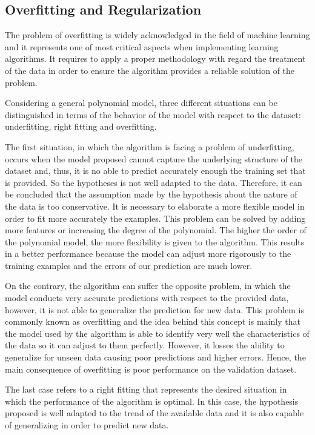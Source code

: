 \documentclass[a4paper, report, oneside, UKenglish]{memoir}
\begin{document}
\subsection{Overfitting and Regularization}

The problem of overfitting is widely acknowledged in the field of machine learning and it represents one of most critical aspects when implementing learning algorithms. It requires to apply a proper methodology with regard the treatment of the data in order to ensure the algorithm provides a reliable solution of the problem.  

Considering a general polynomial model, three different situations can be distinguished in terms of the behavior of the model with respect to the dataset: underfitting, right fitting and overfitting. 

The first situation, in which the algorithm is facing a problem of underfitting, occurs when the model proposed cannot capture the underlying structure of the dataset and, thus, it is no able to predict accurately enough the training set that is provided. So the hypotheses is not well adapted to the data. Therefore, it can be concluded that the assumption made by the hypothesis about the nature of the data is too conservative. It is necessary to elaborate a more flexible model in order to fit more accurately the examples.
This problem can be solved by adding more features or increasing the degree of the polynomial. The higher the order of the polynomial model, the more flexibility is given to the algorithm. This results in a better performance because the model can adjust more rigorously to the training examples and the errors of our prediction are much lower. 

On the contrary, the algorithm can suffer the opposite problem, in which the model conducts very accurate predictions with respect to the provided data, however, it is not able to generalize the prediction for new data. This problem is commonly known as overfitting and the idea behind this concept is mainly that the model used by the algorithm is able to identify very well the characteristics of the data so it can adjust to them perfectly. However, it losses the ability to generalize for unseen data causing poor predictions and higher errors. Hence, the main consequence of overfitting is poor performance on the validation dataset. 

The last case refers to a right fitting that represents the desired situation in which the performance of the algorithm is optimal. In this case, the hypothesis proposed is well adapted to the trend of the available data and it is also capable of generalizing in order to predict new data. 
\end{document}
